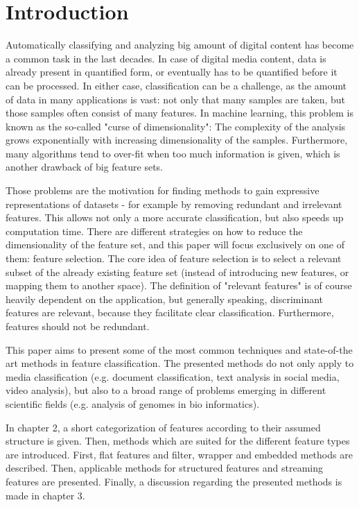 \section{Introduction}
\label{sec:introduction}


Automatically classifying and analyzing big amount of digital content has become a common task in the last decades. In case of digital media content, data is already present in quantified form, or eventually has to be quantified before it can be processed. In either case, classification can be a challenge, as the amount of data in many applications is vast: not only that many samples are taken, but those samples often consist of many features. In machine learning, this problem is known as the so-called "curse of dimensionality": The complexity of the analysis grows exponentially with increasing dimensionality of the samples. Furthermore, many algorithms tend to over-fit when too much information is given, which is another drawback of big feature sets. \cite{Verikas:02}

Those problems are the motivation for finding methods to gain expressive representations of datasets - for example by removing redundant and irrelevant features. This allows not only a more accurate classification, but also speeds up computation time. There are different strategies on how to reduce the dimensionality of the feature set, and this paper will focus exclusively on one of them: feature selection. The core idea of feature selection is to select a relevant subset of the already existing feature set (instead of introducing new features, or mapping them to another space). The definition of "relevant features" is of course heavily dependent on the application, but generally speaking, discriminant features are relevant, because they facilitate clear classification. Furthermore, features should not be redundant.

This paper aims to present some of the most common techniques and state-of-the art methods in feature classification. The presented methods do not only apply to media classification (e.g. document classification, text analysis in social media, video analysis), but also to a broad range of problems emerging in different scientific fields (e.g. analysis of genomes in bio informatics).

In chapter 2, a short categorization of features according to their assumed structure is given. Then, methods which are suited for the different feature types are introduced. First, flat features and filter, wrapper and embedded methods are described. Then, applicable methods for structured features and streaming features are presented. Finally, a discussion regarding the presented methods is made in chapter 3.



